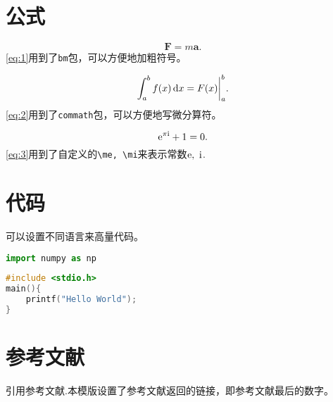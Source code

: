 \section{公式}


\begin{equation}
    \bm{F} = m\bm{a}.
    \label{eq:1}
\end{equation}
\cref{eq:1}用到了\texttt{bm}包，可以方便地加粗符号。

\begin{equation}
    \int^b_a f(x) \dif x=F(x)\bigg|^b_a.
    \label{eq:2}
\end{equation}
\cref{eq:2}用到了\texttt{commath}包，可以方便地写微分算符。

\begin{equation}
    \mathrm{e} ^{\pi \mathrm{i}} + 1 = 0.
    \label{eq:3}
\end{equation}
\cref{eq:3}用到了自定义的\verb"\me, \mi"来表示常数$\mathrm{e},\ \mathrm{i}$.

\section{代码}

可以设置不同语言来高量代码。

\begin{lstlisting}[language=python]
import numpy as np
\end{lstlisting}

\begin{lstlisting}[language=c]
#include <stdio.h>
main(){
    printf("Hello World");
}
\end{lstlisting}

\section{参考文献}

引用参考文献\cite{xie2019artificial2}.本模版设置了参考文献返回的链接，即参考文献最后的数字。
